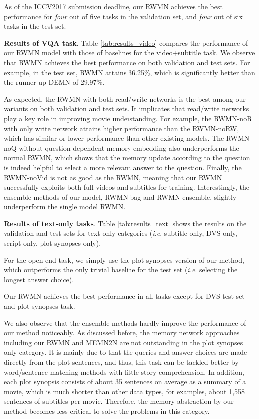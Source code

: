 \documentclass[10pt,twocolumn,letterpaper]{article}
\makeatletter
\theoremstyle{nonumberplain}
\DeclareRobustCommand\onedot{\futurelet\@let@token\@onedot}
\def\onedot{.\@\xspace}
\def\eg{\emph{e.g}\onedot} \def\Eg{\emph{E.g}\onedot}
\def\ie{\emph{i.e}\onedot} \def\Ie{\emph{I.e}\onedot}
\makeatother
\begin{document}
As of the ICCV2017 submission deadline, our RWMN achieves the best performance for \textit{four} out of five tasks in the validation set, and \textit{four} out of six tasks in the test set.

\smallskip
\textbf{Results of VQA task}. 
Table \ref{tab:results_video} compares the performance of our RWMN model with those of baselines for the video+subtitle task.
We observe that RWMN achieves the best performance on both validation and test sets.
For example, in the test set, RWMN attains 36.25\%, which is significantly better than the runner-up DEMN of 29.97\%.

As expected, the RWMN with both read/write networks is the best among our variants on both validation and test sets.
It implicates that read/write networks play a key role in improving movie understanding.
For example, the RWMN-noR with only write network attains higher performance than the RWMN-noRW, which has similar or lower performance than other existing models. 
The RWMN-noQ without question-dependent memory embedding also underperforms the normal RWMN, which shows that the memory update according to the question is indeed helpful to select a more relevant answer to the question.
Finally, the RWMN-noVid is not as good as the RWMN, meaning that our RWMN successfully exploits both full videos and subtitles for training.
Interestingly, the ensemble methods of our model, RWMN-bag and RWMN-ensemble, slightly underperform the  single model RWMN. 

\smallskip
\textbf{Results of text-only tasks}. 
Table \ref{tab:results_text} shows the results on the validation and test sets for text-only categories (\ie subtitle only, DVS only, script only, plot synopses only).
\begin{comment}
We defer the results on the test set to the supplementary material.
\end{comment}
For the open-end task, we simply use the plot synopses version of our method, which outperforms the only trivial baseline for the test set (\ie selecting the longest answer choice).

Our RWMN achieves the best performance in all tasks except for DVS-test set and plot synopses task.
\begin{comment}
In the script only task, our RWMN slightly underperforms the best baseline MEMN2N~\cite{tapaswi2016movieqa}, but the margin is trivial (\eg RWMN: 42.1 and MEMN2N : 42.3).
\end{comment}
We also observe that the ensemble methods hardly improve the performance of our method noticeably.
As discussed before, the memory network approaches including our RWMN and MEMN2N are not outstanding in the plot synopses only category.
It is mainly due to that the queries and answer choices are made directly from the plot sentences, 
and thus, this task can be tackled better by word/sentence matching methods with little story comprehension.
In addition, each plot synopsis consists of about 35 sentences on average as a summary of a movie, which is much shorter than other data types,
for examples, about 1,558 sentences of subtitles per movie. 
Therefore, the memory abstraction by our method becomes less critical to solve the problems in this category. 
\end{document}
